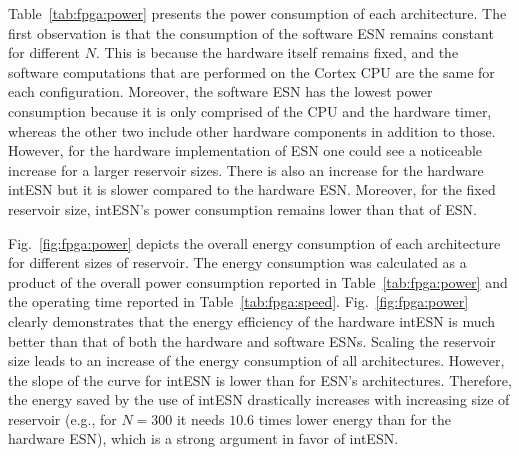 Table~\ref{tab:fpga:power} presents  the power consumption of each architecture. 
The first observation is that the consumption of the  software ESN remains constant for different $N$.
This is because the hardware itself remains fixed, and the software computations that are performed on the Cortex CPU are the same for each configuration. 
Moreover, the software ESN has the lowest power consumption because it is only comprised of the CPU and the hardware timer, whereas the other two include other hardware components in addition to those. 
However, for the hardware implementation of ESN one could see a noticeable increase for a larger reservoir sizes. There is also an increase for the hardware intESN but it is slower compared to the hardware ESN. 
Moreover, for the fixed reservoir size, intESN's power consumption remains lower than that of ESN.

Fig.~\ref{fig:fpga:power} depicts the overall energy consumption of each architecture for different sizes of reservoir.
The energy consumption was calculated as a product of the overall power consumption reported in Table~\ref{tab:fpga:power} and the operating time reported in Table~\ref{tab:fpga:speed}. 
Fig.~\ref{fig:fpga:power} clearly demonstrates that the energy efficiency of the hardware intESN is much better than that of both the hardware and software ESNs.
Scaling the reservoir size leads to an increase of the energy consumption of all architectures.
However, the slope of the curve for intESN is lower than for ESN's architectures. 
Therefore, the energy saved by the use of intESN drastically increases with increasing size of reservoir (e.g., for $N=300$ it needs $10.6$ times lower energy than for the hardware ESN), which is a strong argument in favor of intESN. 


